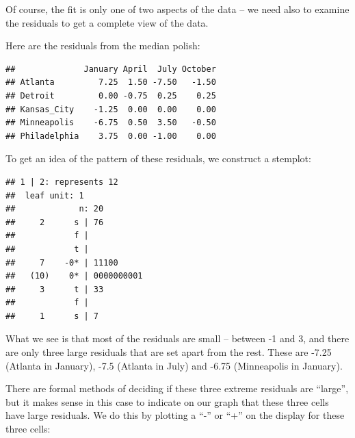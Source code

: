 \documentclass[
]{book}
\newenvironment{Shaded}{\begin{snugshade}}{\end{snugshade}}
\newcommand{\AttributeTok}[1]{\textcolor[rgb]{0.77,0.63,0.00}{#1}}
\newcommand{\DecValTok}[1]{\textcolor[rgb]{0.00,0.00,0.81}{#1}}
\newcommand{\FunctionTok}[1]{\textcolor[rgb]{0.00,0.00,0.00}{#1}}
\newcommand{\NormalTok}[1]{#1}
\newcommand{\SpecialCharTok}[1]{\textcolor[rgb]{0.00,0.00,0.00}{#1}}
\begin{document}
Of course, the fit is only one of two aspects of the data -- we need also to examine the residuals to get a complete view of the data.

Here are the residuals from the median polish:

\begin{Shaded}
\end{Shaded}

\begin{verbatim}
##              January April  July October
## Atlanta         7.25  1.50 -7.50   -1.50
## Detroit         0.00 -0.75  0.25    0.25
## Kansas_City    -1.25  0.00  0.00    0.00
## Minneapolis    -6.75  0.50  3.50   -0.50
## Philadelphia    3.75  0.00 -1.00    0.00
\end{verbatim}

To get an idea of the pattern of these residuals, we construct a stemplot:

\begin{Shaded}
\end{Shaded}

\begin{verbatim}
## 1 | 2: represents 12
##  leaf unit: 1
##             n: 20
##     2      s | 76
##            f | 
##            t | 
##     7    -0* | 11100
##   (10)    0* | 0000000001
##     3      t | 33
##            f | 
##     1      s | 7
\end{verbatim}

What we see is that most of the residuals are small -- between -1 and 3, and there are only three large residuals that are set apart from the rest. These are -7.25 (Atlanta in January), -7.5 (Atlanta in July) and -6.75 (Minneapolis in January).

There are formal methods of deciding if these three extreme residuals are ``large'', but it makes sense in this case to indicate on our graph that these three cells have large residuals. We do this by plotting a ``-'' or ``+'' on the display for these three cells:
\end{document}
